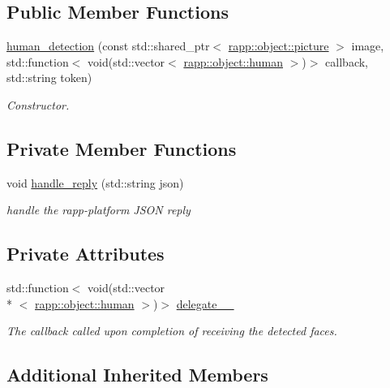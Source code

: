 \subsection*{Public Member Functions}
\begin{DoxyCompactItemize}
\item 
\hyperlink{classrapp_1_1cloud_1_1human__detection_a98d56d1951de9c4bcbb0ca57b7f95317}{human\-\_\-detection} (const std\-::shared\-\_\-ptr$<$ \hyperlink{classrapp_1_1object_1_1picture}{rapp\-::object\-::picture} $>$ image, std\-::function$<$ void(std\-::vector$<$ \hyperlink{classrapp_1_1object_1_1human}{rapp\-::object\-::human} $>$)$>$ callback, std\-::string token)
\begin{DoxyCompactList}\small\item\em Constructor. \end{DoxyCompactList}\end{DoxyCompactItemize}
\subsection*{Private Member Functions}
\begin{DoxyCompactItemize}
\item 
void \hyperlink{classrapp_1_1cloud_1_1human__detection_a8fca03d4fc737641da591d6b16aea62e}{handle\-\_\-reply} (std\-::string json)
\begin{DoxyCompactList}\small\item\em handle the rapp-\/platform J\-S\-O\-N reply \end{DoxyCompactList}\end{DoxyCompactItemize}
\subsection*{Private Attributes}
\begin{DoxyCompactItemize}
\item 
std\-::function$<$ void(std\-::vector\\*
$<$ \hyperlink{classrapp_1_1object_1_1human}{rapp\-::object\-::human} $>$)$>$ \hyperlink{classrapp_1_1cloud_1_1human__detection_ac72243e2f29e25cd927a5664a79c626f}{delegate\-\_\-\-\_\-}
\begin{DoxyCompactList}\small\item\em The callback called upon completion of receiving the detected faces. \end{DoxyCompactList}\end{DoxyCompactItemize}
\subsection*{Additional Inherited Members}


